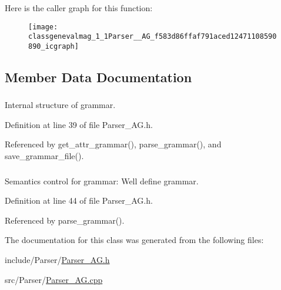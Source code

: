 Here is the caller graph for this function:\nopagebreak
\begin{figure}[H]
\begin{center}
\leavevmode
\texttt{[image: classgenevalmag\_1\_1Parser\_\_AG\_f583d86ffaf791aced12471108590890\_icgraph]}
\end{center}
\end{figure}


\subsection{Member Data Documentation}
\hypertarget{classgenevalmag_1_1Parser__AG_f806906189d19d98132d94b2fdf4a7d1}{
\subsubsection[{attr\_\-grammar}]{}}
\label{classgenevalmag_1_1Parser__AG_f806906189d19d98132d94b2fdf4a7d1}


Internal structure of grammar. 



Definition at line 39 of file Parser\_\-AG.h.

Referenced by get\_\-attr\_\-grammar(), parse\_\-grammar(), and save\_\-grammar\_\-file().\hypertarget{classgenevalmag_1_1Parser__AG_0ae8c86d8db3e9e354377588754559fe}{
\subsubsection[{sem\_\-check}]{}}
\label{classgenevalmag_1_1Parser__AG_0ae8c86d8db3e9e354377588754559fe}


Semantics control for grammar: Well define grammar. 



Definition at line 44 of file Parser\_\-AG.h.

Referenced by parse\_\-grammar().

The documentation for this class was generated from the following files:\begin{CompactItemize}
\item 
include/Parser/\hyperlink{Parser__AG_8h}{Parser\_\-AG.h}\item 
src/Parser/\hyperlink{Parser__AG_8cpp}{Parser\_\-AG.cpp}\end{CompactItemize}
